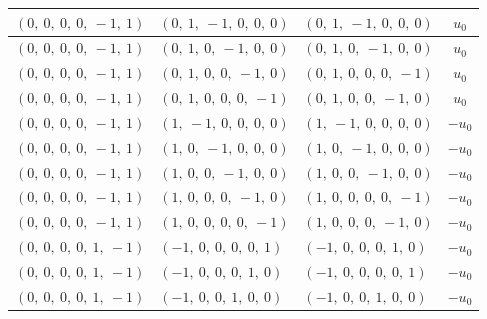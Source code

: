 \documentclass[11pt]{article}
\theoremstyle{definition}
\begin{document}
\begin{longtable}{|l|l|l|c|}
    \hline
    $\left( 0, \  0, \  0, \  0, \  -1, \  1\right)$ & $\left( 0, \  1, \  -1, \  0, \  0, \  0\right)$ & $\left( 0, \  1, \  -1, \  0, \  0, \  0\right)$ & $u_{0}$ \\
    \hline
    $\left( 0, \  0, \  0, \  0, \  -1, \  1\right)$ & $\left( 0, \  1, \  0, \  -1, \  0, \  0\right)$ & $\left( 0, \  1, \  0, \  -1, \  0, \  0\right)$ & $u_{0}$ \\
    \hline
    $\left( 0, \  0, \  0, \  0, \  -1, \  1\right)$ & $\left( 0, \  1, \  0, \  0, \  -1, \  0\right)$ & $\left( 0, \  1, \  0, \  0, \  0, \  -1\right)$ & $u_{0}$ \\
    \hline
    $\left( 0, \  0, \  0, \  0, \  -1, \  1\right)$ & $\left( 0, \  1, \  0, \  0, \  0, \  -1\right)$ & $\left( 0, \  1, \  0, \  0, \  -1, \  0\right)$ & $u_{0}$ \\
    \hline
    $\left( 0, \  0, \  0, \  0, \  -1, \  1\right)$ & $\left( 1, \  -1, \  0, \  0, \  0, \  0\right)$ & $\left( 1, \  -1, \  0, \  0, \  0, \  0\right)$ & $- u_{0}$ \\
    \hline
    $\left( 0, \  0, \  0, \  0, \  -1, \  1\right)$ & $\left( 1, \  0, \  -1, \  0, \  0, \  0\right)$ & $\left( 1, \  0, \  -1, \  0, \  0, \  0\right)$ & $- u_{0}$ \\
    \hline
    $\left( 0, \  0, \  0, \  0, \  -1, \  1\right)$ & $\left( 1, \  0, \  0, \  -1, \  0, \  0\right)$ & $\left( 1, \  0, \  0, \  -1, \  0, \  0\right)$ & $- u_{0}$ \\
    \hline
    $\left( 0, \  0, \  0, \  0, \  -1, \  1\right)$ & $\left( 1, \  0, \  0, \  0, \  -1, \  0\right)$ & $\left( 1, \  0, \  0, \  0, \  0, \  -1\right)$ & $- u_{0}$ \\
    \hline
    $\left( 0, \  0, \  0, \  0, \  -1, \  1\right)$ & $\left( 1, \  0, \  0, \  0, \  0, \  -1\right)$ & $\left( 1, \  0, \  0, \  0, \  -1, \  0\right)$ & $- u_{0}$ \\
    \hline
    $\left( 0, \  0, \  0, \  0, \  1, \  -1\right)$ & $\left( -1, \  0, \  0, \  0, \  0, \  1\right)$ & $\left( -1, \  0, \  0, \  0, \  1, \  0\right)$ & $- u_{0}$ \\
    \hline
    $\left( 0, \  0, \  0, \  0, \  1, \  -1\right)$ & $\left( -1, \  0, \  0, \  0, \  1, \  0\right)$ & $\left( -1, \  0, \  0, \  0, \  0, \  1\right)$ & $- u_{0}$ \\
    \hline
    $\left( 0, \  0, \  0, \  0, \  1, \  -1\right)$ & $\left( -1, \  0, \  0, \  1, \  0, \  0\right)$ & $\left( -1, \  0, \  0, \  1, \  0, \  0\right)$ & $- u_{0}$ \\

\end{longtable}
\end{document}
